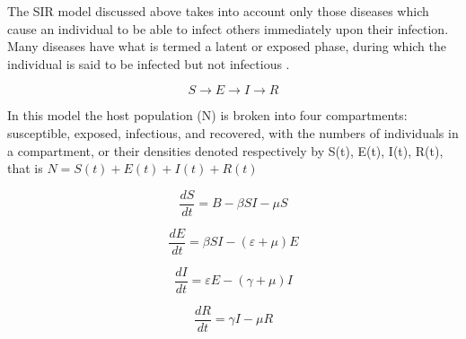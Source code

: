 The SIR model discussed above takes into account only those diseases which cause an individual to be able to infect others immediately upon their infection. Many diseases have what is termed a latent or exposed phase, during which the individual is said to be infected but not infectious \cite{bib9}.

\begin{equation}
S \rightarrow E \rightarrow I \rightarrow R
\end{equation}

In this model the host population (N) is broken into four compartments: susceptible, exposed, infectious, and recovered, with the numbers of individuals in a compartment, or their densities denoted respectively by S(t), E(t), I(t), R(t), that is $N = S(t) + E(t) + I(t) + R(t)$

\begin{equation}
\frac{dS}{dt} = B -\beta S I - \mu S
\end{equation}

\begin{equation}
\frac{dE}{dt} = \beta S I - (\varepsilon + \mu) E
\end{equation}

\begin{equation}
\frac{dI}{dt} = \varepsilon E - (\gamma + \mu) I
\end{equation}

\begin{equation}
\frac{dR}{dt} = \gamma I - \mu R
\end{equation}